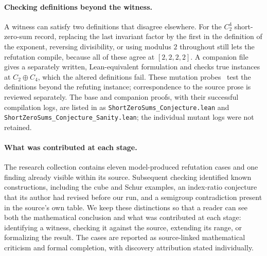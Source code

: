 \paragraph{Checking definitions beyond the witness.}
A witness can satisfy two definitions that disagree elsewhere. For the $C_2^4$ short-zero-sum record, replacing the last invariant factor by the first in the definition of the exponent, reversing divisibility, or using modulus $2$ throughout still lets the refutation compile, because all of these agree at $[2,2,2,2]$. A companion file gives a separately written, Lean-equivalent formulation and checks true instances at $C_2\oplus C_4$, which the altered definitions fail. These mutation probes~\citep{jia2011mutation} test the definitions beyond the refuting instance; correspondence to the source prose is reviewed separately. The base and companion proofs, with their successful compilation logs, are listed in  as \texttt{ShortZeroSums\_Conjecture.lean} and \texttt{ShortZeroSums\_Conjecture\_Sanity.lean}; the individual mutant logs were not retained.

\paragraph{What was contributed at each stage.}
The research collection contains eleven model-produced refutation cases and one finding already visible within its source. Subsequent checking identified known constructions, including the cube and Schur examples, an index-ratio conjecture that its author had revised before our run, and a semigroup contradiction present in the source's own table. We keep these distinctions so that a reader can see both the mathematical conclusion and what was contributed at each stage: identifying a witness, checking it against the source, extending its range, or formalizing the result. The cases are reported as source-linked mathematical criticism and formal completion, with discovery attribution stated individually.
